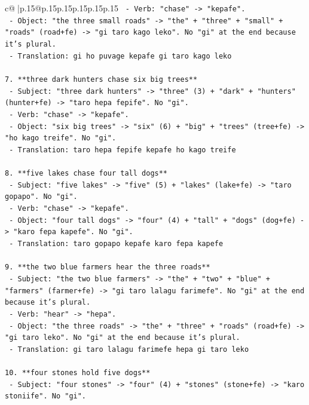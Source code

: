 \documentclass{article}
\begin{document}
{\begin{supertabular}{c@{$\;$}|p{.15\linewidth}@{}p{.15\linewidth}p{.15\linewidth}p{.15\linewidth}p{.15\linewidth}p{.15\linewidth}}
{{{\texttt{   {-} Verb: "chase" {-}> "kepafe".} \\
\texttt{   {-} Object: "the three small roads" {-}> "the" + "three" + "small" + "roads" (road+fe) {-}> "gi taro kago leko". No "gi" at the end because it's plural.} \\
\texttt{   {-} Translation: gi ho puvage kepafe gi taro kago leko} \\
\\ 
\texttt{7. **three dark hunters chase six big trees**} \\
\texttt{   {-} Subject: "three dark hunters" {-}> "three" (3) + "dark" + "hunters" (hunter+fe) {-}> "taro hepa fepife". No "gi".} \\
\texttt{   {-} Verb: "chase" {-}> "kepafe".} \\
\texttt{   {-} Object: "six big trees" {-}> "six" (6) + "big" + "trees" (tree+fe) {-}> "ho kago treife". No "gi".} \\
\texttt{   {-} Translation: taro hepa fepife kepafe ho kago treife} \\
\\ 
\texttt{8. **five lakes chase four tall dogs**} \\
\texttt{   {-} Subject: "five lakes" {-}> "five" (5) + "lakes" (lake+fe) {-}> "taro gopapo". No "gi".} \\
\texttt{   {-} Verb: "chase" {-}> "kepafe".} \\
\texttt{   {-} Object: "four tall dogs" {-}> "four" (4) + "tall" + "dogs" (dog+fe) {-}> "karo fepa kapefe". No "gi".} \\
\texttt{   {-} Translation: taro gopapo kepafe karo fepa kapefe} \\
\\ 
\texttt{9. **the two blue farmers hear the three roads**} \\
\texttt{   {-} Subject: "the two blue farmers" {-}> "the" + "two" + "blue" + "farmers" (farmer+fe) {-}> "gi taro lalagu farimefe". No "gi" at the end because it's plural.} \\
\texttt{   {-} Verb: "hear" {-}> "hepa".} \\
\texttt{   {-} Object: "the three roads" {-}> "the" + "three" + "roads" (road+fe) {-}> "gi taro leko". No "gi" at the end because it's plural.} \\
\texttt{   {-} Translation: gi taro lalagu farimefe hepa gi taro leko} \\
\\ 
\texttt{10. **four stones hold five dogs**} \\
\texttt{    {-} Subject: "four stones" {-}> "four" (4) + "stones" (stone+fe) {-}> "karo stoniife". No "gi".} \\
}}}
\end{supertabular}}
\end{document}
